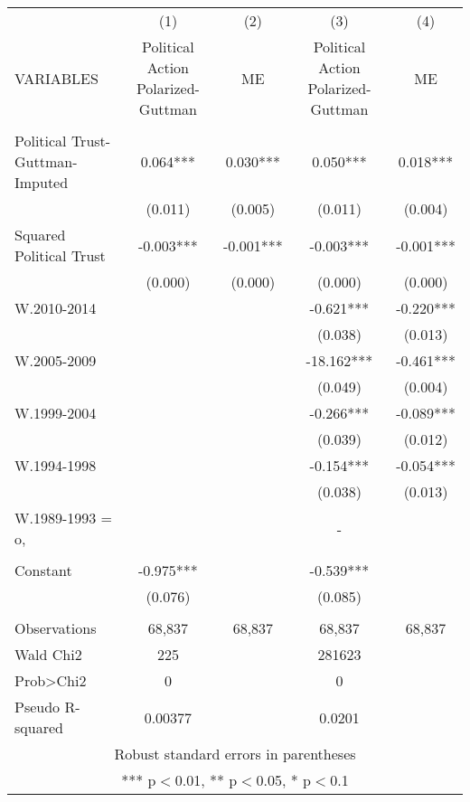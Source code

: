 \documentclass[]{article}
\begin{document}
\begin{tabular}{lcccc} \hline
 & (1) & (2) & (3) & (4) \\
VARIABLES & Political Action Polarized-Guttman & ME & Political Action Polarized-Guttman & ME \\ \hline
 &  &  &  &  \\
Political Trust-Guttman-Imputed & 0.064*** & 0.030*** & 0.050*** & 0.018*** \\
 & (0.011) & (0.005) & (0.011) & (0.004) \\
Squared Political Trust & -0.003*** & -0.001*** & -0.003*** & -0.001*** \\
 & (0.000) & (0.000) & (0.000) & (0.000) \\
W.2010-2014 &  &  & -0.621*** & -0.220*** \\
 &  &  & (0.038) & (0.013) \\
W.2005-2009 &  &  & -18.162*** & -0.461*** \\
 &  &  & (0.049) & (0.004) \\
W.1999-2004 &  &  & -0.266*** & -0.089*** \\
 &  &  & (0.039) & (0.012) \\
W.1994-1998 &  &  & -0.154*** & -0.054*** \\
 &  &  & (0.038) & (0.013) \\
W.1989-1993 = o, &  &  & - &  \\
 &  &  &  &  \\
Constant & -0.975*** &  & -0.539*** &  \\
 & (0.076) &  & (0.085) &  \\
 &  &  &  &  \\
Observations & 68,837 & 68,837 & 68,837 & 68,837 \\
Wald Chi2 & 225 &  & 281623 &  \\
Prob>Chi2 & 0 &  & 0 &  \\
 Pseudo R-squared & 0.00377 &  & 0.0201 &  \\ \hline
\multicolumn{5}{c}{ Robust standard errors in parentheses} \\
\multicolumn{5}{c}{ *** p$<$0.01, ** p$<$0.05, * p$<$0.1} \\
\end{tabular}
\end{document}
